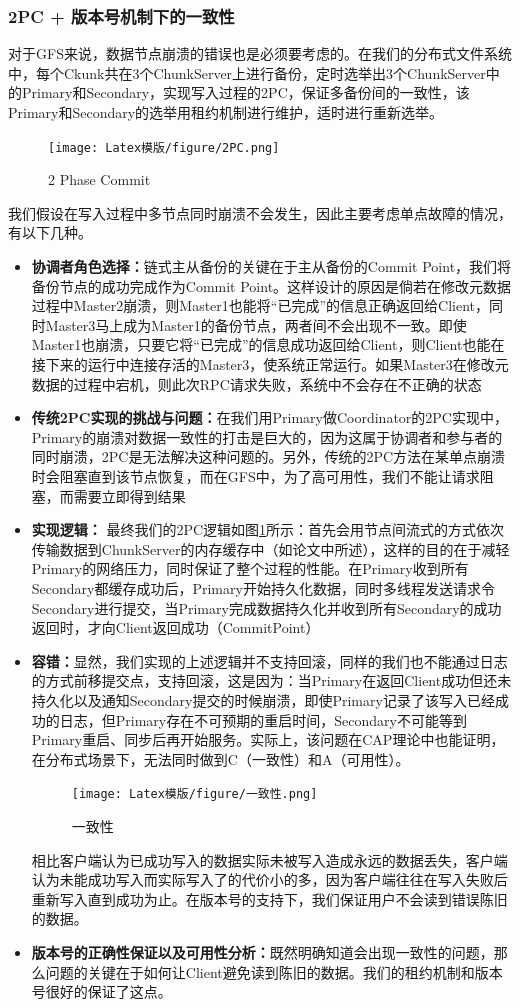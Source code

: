\documentclass[UTF8]{ctexart}
\begin{document}
\subsubsection{2PC + 版本号机制下的一致性}
对于GFS来说，数据节点崩溃的错误也是必须要考虑的。在我们的分布式文件系统中，每个Ckunk共在3个ChunkServer上进行备份，定时选举出3个ChunkServer中的Primary和Secondary，实现写入过程的2PC，保证多备份间的一致性，该Primary和Secondary的选举用租约机制进行维护，适时进行重新选举。
\begin{figure}[h]
    \centering
    \texttt{[image: Latex模版/figure/2PC.png]}
	\caption{2 Phase Commit}
	\label{fig:2PC}
\end{figure}
我们假设在写入过程中多节点同时崩溃不会发生，因此主要考虑单点故障的情况，有以下几种。
\begin{itemize}
\item \textbf{协调者角色选择：}链式主从备份的关键在于主从备份的Commit Point，我们将备份节点的成功完成作为Commit Point。这样设计的原因是倘若在修改元数据过程中Master2崩溃，则Master1也能将“已完成”的信息正确返回给Client，同时Master3马上成为Master1的备份节点，两者间不会出现不一致。即使Master1也崩溃，只要它将“已完成”的信息成功返回给Client，则Client也能在接下来的运行中连接存活的Master3，使系统正常运行。如果Master3在修改元数据的过程中宕机，则此次RPC请求失败，系统中不会存在不正确的状态
\item \textbf{传统2PC实现的挑战与问题：}在我们用Primary做Coordinator的2PC实现中，Primary的崩溃对数据一致性的打击是巨大的，因为这属于协调者和参与者的同时崩溃，2PC是无法解决这种问题的。另外，传统的2PC方法在某单点崩溃时会阻塞直到该节点恢复，而在GFS中，为了高可用性，我们不能让请求阻塞，而需要立即得到结果
\item \textbf{实现逻辑：} 最终我们的2PC逻辑如图\ref{fig:2PC}所示：首先会用节点间流式的方式依次传输数据到ChunkServer的内存缓存中（如论文中所述），这样的目的在于减轻Primary的网络压力，同时保证了整个过程的性能。在Primary收到所有Secondary都缓存成功后，Primary开始持久化数据，同时多线程发送请求令Secondary进行提交，当Primary完成数据持久化并收到所有Secondary的成功返回时，才向Client返回成功（CommitPoint）
\item \textbf{容错：}显然，我们实现的上述逻辑并不支持回滚，同样的我们也不能通过日志的方式前移提交点，支持回滚，这是因为：当Primary在返回Client成功但还未持久化以及通知Secondary提交的时候崩溃，即使Primary记录了该写入已经成功的日志，但Primary存在不可预期的重启时间，Secondary不可能等到Primary重启、同步后再开始服务。实际上，该问题在CAP理论中也能证明，在分布式场景下，无法同时做到C（一致性）和A（可用性）。
\begin{figure}[h]
    \centering
    \texttt{[image: Latex模版/figure/一致性.png]}
	\caption{一致性}
	\label{fig:一致性}
\end{figure}
相比客户端认为已成功写入的数据实际未被写入造成永远的数据丢失，客户端认为未能成功写入而实际写入了的代价小的多，因为客户端往往在写入失败后重新写入直到成功为止。在版本号的支持下，我们保证用户不会读到错误陈旧的数据。
\item \textbf{版本号的正确性保证以及可用性分析：}既然明确知道会出现一致性的问题，那么问题的关键在于如何让Client避免读到陈旧的数据。我们的租约机制和版本号很好的保证了这点。


\end{itemize}
\end{document}
